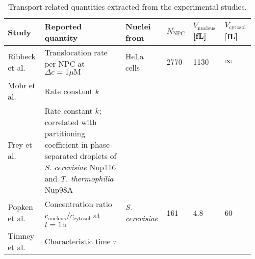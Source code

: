 \documentclass[10pt, a4paper, twocolumn]{article}
\begin{document}
\begin{table*}[h]
\begin{minipage}{\linewidth}
\centering
\caption{Transport-related quantities extracted from the experimental studies.}
\label{tbl:experimental}
\begin{tabular}{p{3cm}|p{6.8cm}|p{2cm}|p{1cm}|p{1cm}|p{1cm}}
Study & Reported quantity & Nuclei from & $N_\text{NPC}$ & $V_\text{nucleus}$ [fL] & $V_\text{cytosol}$ [fL] \\
\hline
Ribbeck et al. \cite{Ribbeck2001} & Translocation rate per NPC at $\Delta c = 1 \mu\text{M}$ & HeLa cells & 2770 & 1130 & $\infty$ \\
Mohr et al. \cite{Mohr2009} & Rate constant $k$ &  &  &  &  \\
Frey et al. \cite{Frey2018} & Rate constant $k$; \newline  correlated with partitioning coefficient in phase-separated droplets of  \textit{S. cerevisiae} Nup116 and \textit{T. thermophilia} Nup98A &  &  &  &  \\
\hline
Popken et al. \cite{Popken2015} & Concentration ratio $c_\text{nucleus}/c_\text{cytosol}$ at $t = 1 \text{h}$ & \textit{S. cerevisiae} & 161 & 4.8 & 60 \\
Timney et al. \cite{Timney2016} & Characteristic time $\tau$ &  &  &  &  \\
\end{tabular}
\end{minipage}
\end{table*}


\pagebreak
\onecolumn

\printbibliography
\end{document}
